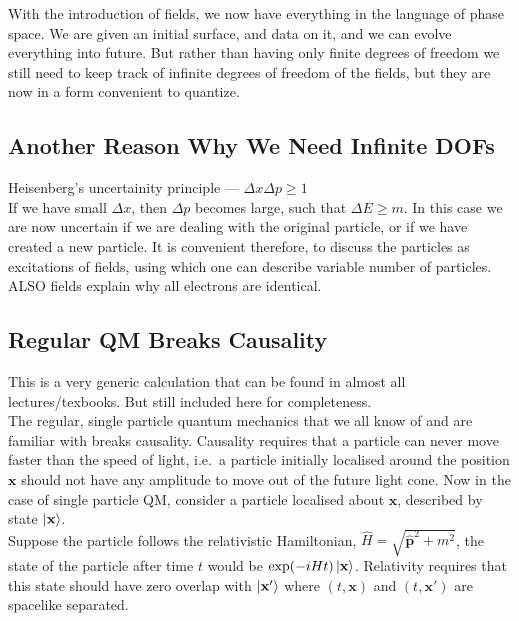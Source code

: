 \documentclass[11pt, notitlepage]{report}
\numberwithin{equation}{section}
\begin{document}
    With the introduction of fields, we now have everything in the language of phase space. We are given an initial surface, and data on it, and we can evolve everything into future. But rather than having only finite degrees of freedom we still need to keep track of infinite degrees of freedom of the fields, but they are now in a form convenient to quantize.\\

    \subsection{Another Reason Why We Need Infinite DOFs}
    Heisenberg's uncertainity principle — \(\Delta x \Delta p \ge1 \)\\
    If we have small \(\Delta x\), then \(\Delta p \) becomes large, such that \(\Delta E \ge m\). In this case we are now uncertain if we are dealing with the original particle, or if we have created a new particle. It is convenient therefore, to discuss the particles as excitations of fields, using which one can describe variable number of particles.\\

    ALSO fields explain why all electrons are identical.\\

    \subsection{Regular QM Breaks Causality}
    This is a very generic calculation that can be found in almost all lectures/texbooks. But still included here for completeness. \\

    The regular, single particle quantum mechanics that we all know of and are familiar with breaks causality. Causality requires that a particle can never move faster than the speed of light, i.e.\ a particle initially localised around the position \(\textbf{x}\) should not have any amplitude to move out of the future light cone. Now in the case of single particle QM, consider a particle localised about \(\textbf{x}\), described by state \(\ket{\textbf{x}}\).\\

    Suppose the particle follows the relativistic Hamiltonian, \(\hat H = \sqrt{\hat{\textbf{p}}^2 + m^2}\), the state of the particle after time \(t\) would be \(\exp(-i H t) \ket{\textbf{x}}\). Relativity requires that this state should have zero overlap with \(\ket{\textbf{x}'}\) where \((t, \textbf{x})\) and \((t, \textbf{x}')\) are spacelike separated.\\
\end{document}
